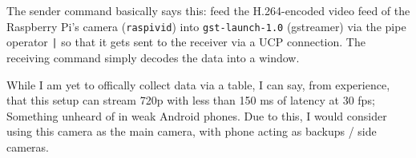 The sender command basically says this: feed the H.264-encoded video feed of the Raspberry Pi's camera (\texttt{raspivid}) into \texttt{gst-launch-1.0} (gstreamer) via the pipe operator \texttt{|} so that it gets sent to the receiver via a UCP connection. The receiving command simply decodes the data into a window.

While I am yet to offically collect data via a table, I can say, from experience, that this setup can stream 720p with less than 150 ms of latency at 30 fps; Something unheard of in weak Android phones. Due to this, I would consider using this camera as the main camera, with phone acting as backups / side cameras.
